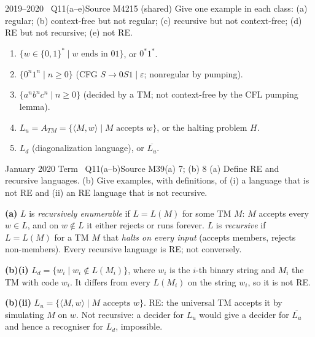 \documentclass[11pt,a4paper]{article}
\newcommand{\eps}{\varepsilon}
\begin{document}
\begin{question}{2019--2020 \textbullet\ Q11(a--e)}{Source M42}{15 (shared)}
Give one example in each class: (a) regular; (b) context-free but not regular; (c) recursive but not context-free; (d) RE but not recursive; (e) not RE.
\end{question}
\begin{solution}
\begin{enumerate}[label=\textbf{(\alph*)}]
\item $\{w\in\{0,1\}^*\mid w\text{ ends in }01\}$, or $0^*1^*$.
\item $\{0^n1^n\mid n\ge0\}$ (CFG $S\to0S1\mid\eps$; nonregular by pumping).
\item $\{a^nb^nc^n\mid n\ge0\}$ (decided by a TM; not context-free by the CFL pumping lemma).
\item $L_u=A_{TM}=\{\langle M,w\rangle\mid M\text{ accepts }w\}$, or the halting problem $H$.
\item $L_d$ (diagonalization language), or $\overline{L_u}$.
\end{enumerate}
\end{solution}

\begin{question}{January 2020 Term \textbullet\ Q11(a--b)}{Source M39}{(a) 7; (b) 8}
(a) Define RE and recursive languages. (b) Give examples, with definitions, of (i) a language that is not RE and (ii) an RE language that is not recursive.
\end{question}
\begin{solution}
\textbf{(a)} $L$ is \emph{recursively enumerable} if $L=L(M)$ for some TM $M$: $M$ accepts every $w\in L$, and on $w\notin L$ it either rejects or runs forever. $L$ is \emph{recursive} if $L=L(M)$ for a TM $M$ that \emph{halts on every input} (accepts members, rejects non-members). Every recursive language is RE; not conversely.

\textbf{(b)(i)} $L_d=\{w_i\mid w_i\notin L(M_i)\}$, where $w_i$ is the $i$-th binary string and $M_i$ the TM with code $w_i$. It differs from every $L(M_i)$ on the string $w_i$, so it is not RE.

\textbf{(b)(ii)} $L_u=\{\langle M,w\rangle\mid M\text{ accepts }w\}$. RE: the universal TM accepts it by simulating $M$ on $w$. Not recursive: a decider for $L_u$ would give a decider for $\overline{L_u}$ and hence a recogniser for $L_d$, impossible.
\end{solution}
\end{document}
